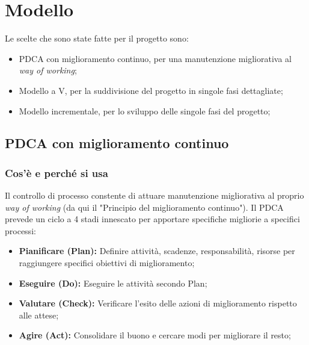\chapter{Modello}
Le scelte che sono state fatte per il progetto sono:
\begin{itemize}
    \item PDCA con miglioramento continuo, per una manutenzione migliorativa al {\it{way of working}};
    \item Modello a V, per la suddivisione del progetto in singole fasi dettagliate;
    \item Modello incrementale, per lo sviluppo delle singole fasi del progetto;
\end{itemize}

\section{PDCA con miglioramento continuo}
\subsection{Cos'è e perché si usa}
Il controllo di processo constente di attuare manutenzione migliorativa al proprio {\it{way of working}} (da qui il "Principio del miglioramento continuo"). Il PDCA prevede un ciclo a 4 stadi innescato per apportare specifiche migliorie a specifici processi:
\begin{itemize}
    \item \textbf{Pianificare (Plan):} Definire attività, scadenze, responsabilità, risorse per raggiungere
    specifici obiettivi di miglioramento; 
    \item \textbf{Eseguire (Do):} Eseguire le attività secondo Plan; 
    \item \textbf{Valutare (Check):} Verificare l’esito delle azioni di miglioramento rispetto alle attese;
    \item \textbf{Agire (Act):} Consolidare il buono e cercare modi per migliorare il resto;
\end{itemize}
